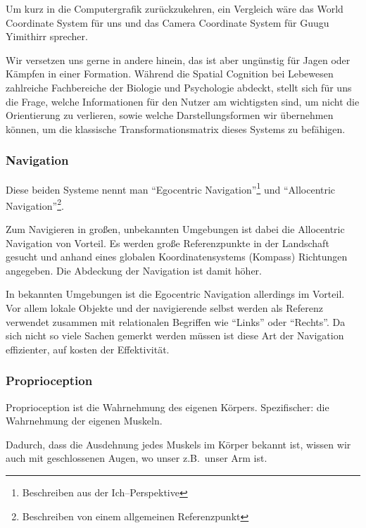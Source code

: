     Um kurz in die Computergrafik zurückzukehren, ein Vergleich wäre das World Coordinate System für uns und das Camera Coordinate System für Guugu Yimithirr sprecher.

    Wir versetzen uns gerne in andere hinein, das ist aber ungünstig für Jagen oder Kämpfen in einer Formation.
    Während die Spatial Cognition bei Lebewesen zahlreiche Fachbereiche der Biologie und Psychologie abdeckt, stellt sich für uns die Frage, welche Informationen für den Nutzer am wichtigsten sind, um nicht die Orientierung zu verlieren, sowie welche Darstellungsformen wir übernehmen können, um die klassische Transformationsmatrix dieses Systems zu befähigen.

    \subsubsection{Navigation}\label{subsubsec:navigation}
        Diese beiden Systeme nennt man \enquote{Egocentric Navigation}\footnote{Beschreiben aus der Ich--Perspektive} und \enquote{Allocentric Navigation}\footnote{Beschreiben von einem allgemeinen Referenzpunkt}.~\autocite{wikipedia-contributors-2023F}

        Zum Navigieren in großen, unbekannten Umgebungen ist dabei die Allocentric Navigation von Vorteil.
        Es werden große Referenzpunkte in der Landschaft gesucht und anhand eines globalen Koordinatensystems (Kompass) Richtungen angegeben.
        Die Abdeckung der Navigation ist damit höher.

        In bekannten Umgebungen ist die Egocentric Navigation allerdings im Vorteil.
        Vor allem lokale Objekte und der navigierende selbst werden als Referenz verwendet zusammen mit relationalen Begriffen wie \enquote{Links} oder \enquote{Rechts}.
        Da sich nicht so viele Sachen gemerkt werden müssen ist diese Art der Navigation effizienter, auf kosten der Effektivität.

    \subsubsection{Proprioception}\label{subsubsec:proprioception}
        Proprioception ist die Wahrnehmung des eigenen Körpers. \autocite{wikipedia-contributors-2023H}
        Spezifischer: die Wahrnehmung der eigenen Muskeln.

        Dadurch, dass die Ausdehnung jedes Muskels im Körper bekannt ist, wissen wir auch mit geschlossenen Augen, wo unser z.B.\ unser Arm ist.

